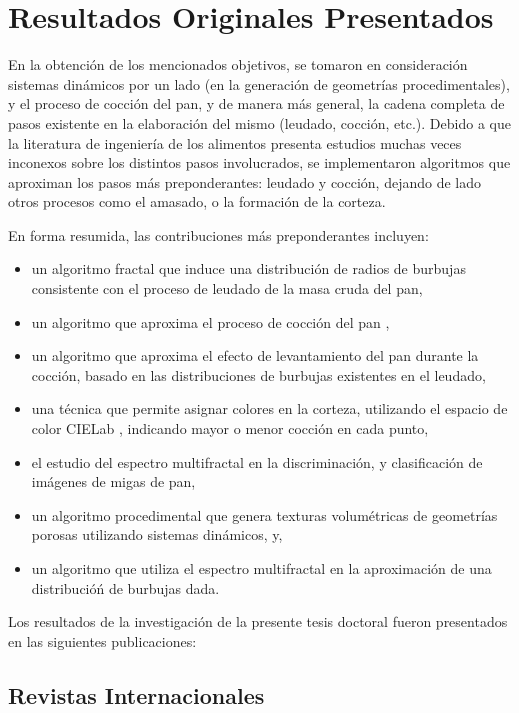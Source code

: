 \section{Resultados Originales Presentados}
En la obtención de los mencionados objetivos, se tomaron en consideración sistemas dinámicos por un lado (en la generación de geometrías procedimentales), y el proceso de cocción del pan, y de manera más general, la cadena completa de pasos existente en la elaboración del mismo (leudado, cocción, etc.).
Debido a que la literatura de ingeniería de los alimentos presenta estudios muchas veces inconexos sobre los distintos pasos involucrados, se implementaron algoritmos que aproximan los pasos más preponderantes: leudado y cocción, dejando de lado otros procesos como el amasado, o la formación de la corteza.

En forma resumida, las contribuciones más preponderantes incluyen:
\begin{itemize}
\item un algoritmo fractal \cite{Mandelbrot1983} que induce una distribución de radios de burbujas consistente con el proceso de leudado de la masa cruda del pan,
\item un algoritmo que aproxima el proceso de cocción del pan \cite{Powathil2004},
\item un algoritmo que aproxima el efecto de levantamiento del pan durante la cocción, basado en las distribuciones de burbujas existentes en el leudado,
\item una técnica que permite asignar colores en la corteza, utilizando el espacio de color CIELab \cite{Hunter58}, indicando mayor o menor cocción en cada punto,
\item el estudio del espectro multifractal \cite{Xu2009} en la discriminación, y clasificación de imágenes de migas de pan,
\item un algoritmo procedimental que genera texturas volumétricas de geometrías porosas utilizando sistemas dinámicos, y,
\item un algoritmo que utiliza el espectro multifractal en la aproximación de una distribucióń de burbujas dada.
\end{itemize}

Los resultados de la investigación de la presente tesis doctoral fueron presentados en las siguientes publicaciones:

\subsection*{Revistas Internacionales}

